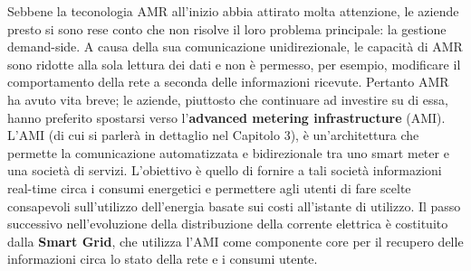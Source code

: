 Sebbene la teconologia AMR all'inizio abbia attirato molta attenzione, le aziende presto si sono rese conto che non risolve il loro problema principale: la gestione demand-side. A causa della sua comunicazione unidirezionale, le capacità di AMR sono ridotte alla sola lettura dei dati e non è permesso, per esempio, modificare il comportamento della rete a seconda delle informazioni ricevute. \newline Pertanto AMR ha avuto vita breve; le aziende, piuttosto che continuare ad investire su di essa, hanno preferito spostarsi verso l'\textbf{advanced metering infrastructure} (AMI). \newline
L'AMI (di cui si parlerà in dettaglio nel Capitolo 3), è un'architettura che permette la comunicazione automatizzata e bidirezionale tra uno smart meter e una società di servizi. L'obiettivo è quello di fornire a tali società informazioni real-time circa i consumi energetici e permettere agli utenti di fare scelte consapevoli sull'utilizzo dell'energia basate sui costi all'istante di utilizzo.
\newline
\newline
Il passo successivo nell'evoluzione della distribuzione della corrente elettrica è costituito dalla \textbf{Smart Grid}, che utilizza l'AMI come componente core per il recupero delle informazioni circa lo stato della rete e i consumi utente.


